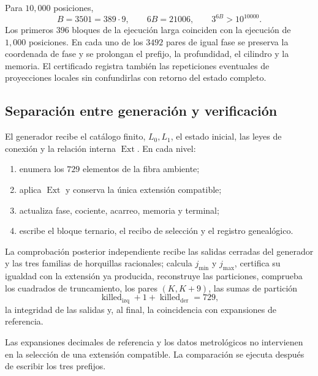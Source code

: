 Para \(10,000\) posiciones,
\[
 B=3501=389\cdot9,
 \qquad
 6B=21006,
 \qquad
 3^{6B}>10^{10000}.
\]
Los primeros \(396\) bloques de la ejecución larga coinciden con la
ejecución de \(1,000\) posiciones. En cada uno de los \(3492\) pares de
igual fase se preserva la coordenada de fase y se prolongan el prefijo, la
profundidad, el cilindro y la memoria. El certificado registra también las
repeticiones eventuales de proyecciones locales sin confundirlas con retorno
del estado completo.

\subsection{Separación entre generación y verificación}

\begin{definition}
El generador recibe el catálogo finito, \(L_0,L_1\), el estado inicial, las
leyes de conexión y la relación interna \(\operatorname{Ext}\). En cada nivel:
\begin{enumerate}
 \item enumera los \(729\) elementos de la fibra ambiente;
 \item aplica \(\operatorname{Ext}\) y conserva la única extensión compatible;
 \item actualiza fase, cociente, acarreo, memoria y terminal;
 \item escribe el bloque ternario, el recibo de selección y el registro genealógico.
\end{enumerate}
\end{definition}

\begin{definition}
La comprobación posterior independiente recibe las salidas cerradas del
generador y las tres familias de horquillas racionales; calcula
\(j_{\min}\) y \(j_{\max}\), certifica su igualdad con la extensión ya
producida, reconstruye las
particiones, comprueba los cuadrados de truncamiento, los pares
\((K,K+9)\), las sumas de partición
\[
 \operatorname{killed}_{\mathrm{izq}}+1+\operatorname{killed}_{\mathrm{der}}=729,
\]
la integridad de las salidas y, al final, la coincidencia con expansiones de referencia.
\end{definition}

\begin{theorem}
\label{p12-83-c9-s4:thm:aislamiento-datos-objetivo-precision}
Las expansiones decimales de referencia y los datos metrológicos no
intervienen en la selección de una extensión compatible. La comparación se
ejecuta después de escribir los tres prefijos.
\end{theorem}

